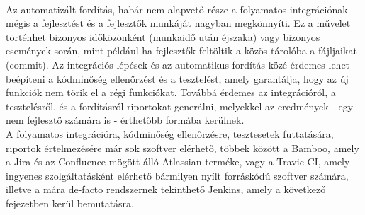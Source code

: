 \\
Az automatizált fordítás, habár nem alapvető része a folyamatos integrációnak mégis a fejlesztést és a fejlesztők munkáját nagyban megkönnyíti. Ez a művelet történhet bizonyos időközönként (munkaidő után éjszaka) vagy bizonyos események során, mint például ha fejlesztők feltöltik a közös tárolóba a fájljaikat (commit). Az integrációs lépések és az automatikus fordítás közé érdemes lehet beépíteni a kódminőség ellenőrzést és a tesztelést, amely garantálja, hogy az új funkciók nem törik el a régi funkciókat. Továbbá érdemes az integrációról, a tesztelésről, és a fordításról riportokat generálni, melyekkel az eredmények - egy nem fejlesztő számára is - érthetőbb formába kerülnek.
\\
A folyamatos integrációra, kódminőség ellenőrzésre, tesztesetek futtatására, riportok értelmezésére már sok szoftver elérhető, többek között a Bamboo, amely a Jira és az Confluence mögött álló Atlassian terméke, vagy a Travic CI, amely ingyenes szolgáltatásként elérhető bármilyen nyílt forráskódú szoftver számára, illetve a mára de-facto rendszernek tekinthető Jenkins, amely a következő fejezetben kerül bemutatásra.

